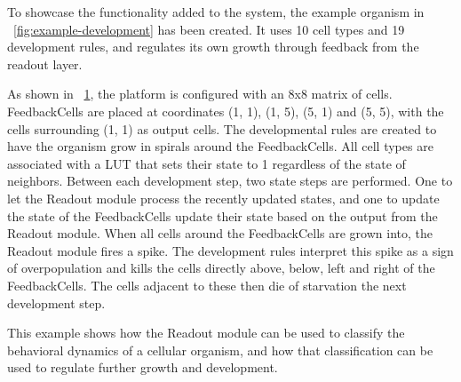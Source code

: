 To showcase the functionality added to the system, the example organism in
\figurename~\ref{fig:example-development} has been created. It uses 10 cell
types and 19 development rules, and regulates its own growth through feedback
from the readout layer.

As shown in \figurename~\ref{fig:example-setup}, the platform is configured with
an 8x8 matrix of cells. FeedbackCells are placed at coordinates (1, 1), (1, 5),
(5, 1) and (5, 5), with the cells surrounding (1, 1) as output cells. The
developmental rules are created to have the organism grow in spirals around the
FeedbackCells. All cell types are associated with a LUT that sets their state to
1 regardless of the state of neighbors. Between each development step, two state
steps are performed. One to let the Readout module process the recently updated
states, and one to update the state of the FeedbackCells update their state
based on the output from the Readout module. When all cells around the
FeedbackCells are grown into, the Readout module fires a spike. The development
rules interpret this spike as a sign of overpopulation and kills the cells
directly above, below, left and right of the FeedbackCells. The cells adjacent
to these then die of starvation the next development step.

This example shows how the Readout module can be used to classify the behavioral
dynamics of a cellular organism, and how that classification can be used to
regulate further growth and development.

\begin{figure}[ht]
  \centering
  \quad
  \caption{\label{fig:example-setup}}
\end{figure}

